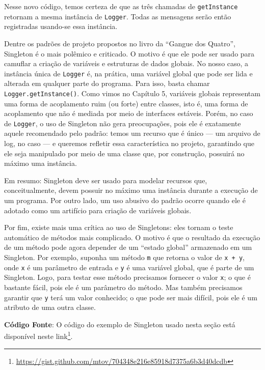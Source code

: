 \documentclass[
  11pt,
  twoside]{book}
\newcommand{\passthrough}[1]{#1}
\DeclareRobustCommand{\href}[2]{#2\footnote{\url{#1}}}
\begin{document}
Nesse novo código, temos certeza de que as três chamadas de
\passthrough{\lstinline!getInstance!} retornam a mesma instância de
\passthrough{\lstinline!Logger!}. Todas as mensagens serão então
registradas usando-se essa instância.

Dentre os padrões de projeto propostos no livro da ``Gangue dos
Quatro'', Singleton é o mais polêmico e criticado. O motivo é que ele
pode ser usado para camuflar a criação de variáveis e estruturas de
dados globais. No nosso caso, a instância única de
\passthrough{\lstinline!Logger!} é, na prática, uma variável global que
pode ser lida e alterada em qualquer parte do programa. Para isso, basta
chamar \passthrough{\lstinline!Logger.getInstance()!}. Como vimos no
Capítulo 5, variáveis globais representam uma forma de acoplamento ruim
(ou forte) entre classes, isto é, uma forma de acoplamento que não é
mediada por meio de interfaces estáveis. Porém, no caso de
\passthrough{\lstinline!Logger!}, o uso de Singleton não gera
preocupações, pois ele é exatamente aquele recomendado pelo padrão:
temos um recurso que é único --- um arquivo de log, no caso --- e
queremos refletir essa característica no projeto, garantindo que ele
seja manipulado por meio de uma classe que, por construção, possuirá no
máximo uma instância.

Em resumo: Singleton deve ser usado para modelar recursos que,
conceitualmente, devem possuir no máximo uma instância durante a
execução de um programa. Por outro lado, um uso abusivo do padrão ocorre
quando ele é adotado como um artifício para criação de variáveis
globais.

Por fim, existe mais uma crítica ao uso de Singletons: eles tornam o
teste automático de métodos mais complicado. O motivo é que o resultado
da execução de um método pode agora depender de um ``estado global''
armazenado em um Singleton. Por exemplo, suponha um método
\passthrough{\lstinline!m!} que retorna o valor de
\passthrough{\lstinline!x + y!}, onde \passthrough{\lstinline!x!} é um
parâmetro de entrada e \passthrough{\lstinline!y!} é uma variável
global, que é parte de um Singleton. Logo, para testar esse método
precisamos fornecer o valor \passthrough{\lstinline!x!}; o que é
bastante fácil, pois ele é um parâmetro do método. Mas também precisamos
garantir que \passthrough{\lstinline!y!} terá um valor conhecido; o que
pode ser mais difícil, pois ele é um atributo de uma outra classe.

\textbf{Código Fonte}: O código do exemplo de Singleton usado nesta
seção está disponível neste
\href{https://gist.github.com/mtov/704348e216e85918d7375a6b3d40dcdb}{link}.
\end{document}
